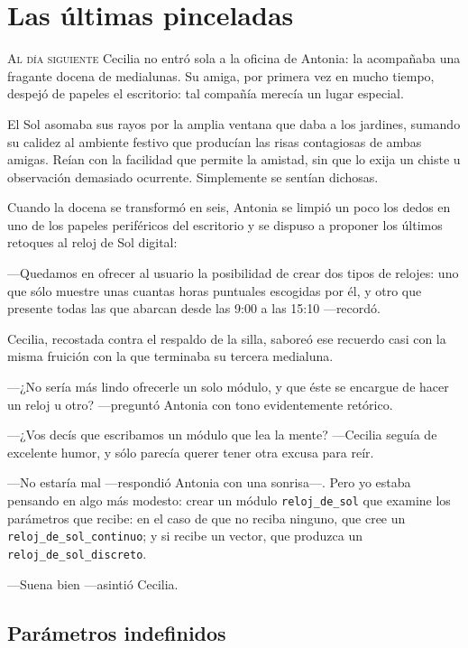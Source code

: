 \chapter{Las últimas pinceladas}
\label{sec:texto}

\lettrine[lines=2]{A}{l día siguiente} Cecilia no entró sola a la
oficina de Antonia: la acompañaba una fragante docena de
medialunas. Su amiga, por primera vez en mucho tiempo, despejó de
papeles el escritorio: tal compañía merecía un lugar especial.

El Sol asomaba sus rayos por la amplia ventana que daba a los
jardines, sumando su calidez al ambiente festivo que producían las
risas contagiosas de ambas amigas. Reían con la facilidad que permite
la amistad, sin que lo exija un chiste u observación demasiado
ocurrente. Simplemente se sentían dichosas.

Cuando la docena se transformó en seis, Antonia se limpió un poco los
dedos en uno de los papeles periféricos del escritorio y se dispuso a
proponer los últimos retoques al reloj de Sol di\-gi\-tal:

---Quedamos en ofrecer al usuario la posibilidad de crear dos tipos de
relojes: uno que sólo muestre unas cuantas horas puntuales escogidas
por él, y otro que presente todas las que abarcan desde las 9:00 a las
15:10 ---recordó.

Cecilia, recostada contra el respaldo de la silla, saboreó ese
recuerdo casi con la misma fruición con la que terminaba su tercera
medialuna.

---¿No sería más lindo ofrecerle un solo módulo, y que éste se
encargue de hacer un reloj u otro? ---preguntó Antonia con tono
evidentemente retórico.

---¿Vos decís que escribamos un módulo que lea la mente?  ---Cecilia
seguía de excelente humor, y sólo parecía querer tener otra excusa
para reír.

---No estaría mal ---respondió Antonia con una son\-ri\-sa---.  Pero
yo estaba pensando en algo más modesto: crear un módulo
\lstinline!reloj_de_sol! que examine los parámetros que recibe: en el
caso de que no reciba ninguno, que cree un
\lstinline!reloj_de_sol_continuo!; y si recibe un vector, que produzca
un \lstinline!reloj_de_sol_discreto!.

---Suena bien ---asintió Cecilia.

\section{Parámetros indefinidos}

